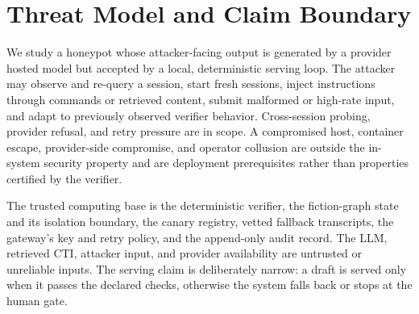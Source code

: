\section{Threat Model and Claim Boundary}
\label{sec:threat-model}

We study a honeypot whose attacker-facing output is generated by a provider
hosted model but accepted by a local, deterministic serving loop. The attacker
may observe and re-query a session, start fresh sessions, inject instructions
through commands or retrieved content, submit malformed or high-rate input,
and adapt to previously observed verifier behavior. Cross-session probing,
provider refusal, and retry pressure are in scope. A compromised host,
container escape, provider-side compromise, and operator collusion are outside
the in-system security property and are deployment prerequisites rather than
properties certified by the verifier.

The trusted computing base is the deterministic verifier, the fiction-graph
state and its isolation boundary, the canary registry, vetted fallback
transcripts, the gateway's key and retry policy, and the append-only audit
record. The LLM, retrieved CTI, attacker input, and provider availability are
untrusted or unreliable inputs. The serving claim is deliberately narrow: a
draft is served only when it passes the declared checks, otherwise the system
falls back or stops at the human gate.

